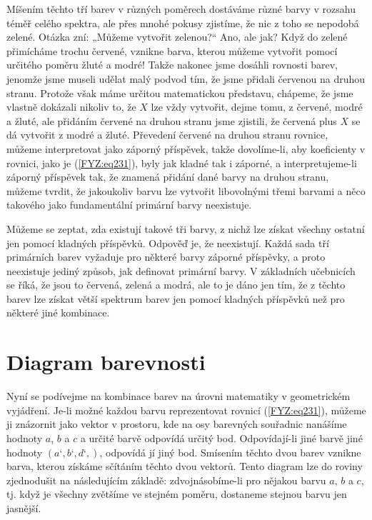 {    Míšením těchto tří barev v různých poměrech dostáváme různé barvy v rozsahu téměř celého 
    spektra, ale přes mnohé pokusy zjistíme, že nic z toho se nepodobá zelené. Otázka zní: „Můžeme 
    vytvořit zelenou?“ Ano, ale jak? Když do zelené přimícháme trochu červené, vznikne barva, 
    kterou můžeme vytvořit pomocí určitého poměru žluté a modré! Takže nakonec jsme dosáhli 
    rovnosti barev, jenomže jsme museli udělat malý podvod tím, že jsme přidali červenou na druhou 
    stranu. Protože však máme určitou matematickou představu, chápeme, že jsme vlastně dokázali 
    nikoliv to, že \(X\) lze vždy vytvořit, dejme tomu, z červené, modré a žluté, ale přidáním 
    červené na druhou stranu jsme zjistili, že červená plus \(X\) se dá vytvořit z modré a žluté. 
    Převedení červené na druhou stranu rovnice, můžeme interpretovat jako záporný příspěvek, takže 
    dovolíme-li, aby koeficienty v rovnici, jako je (\ref{FYZ:eq231}), byly jak kladné tak i 
    záporné, a interpretujeme-li záporný příspěvek tak, že znamená přidání dané barvy na druhou 
    stranu, můžeme tvrdit, že jakoukoliv barvu lze vytvořit libovolnými třemi barvami a něco 
    takového jako fundamentální primární barvy neexistuje.
    
    Můžeme se zeptat, zda existují takové tři barvy, z nichž lze získat všechny ostatní jen pomocí 
    kladných příspěvků. Odpověď je, že neexistují. Každá sada tří primárních barev vyžaduje pro 
    některé barvy záporné příspěvky, a proto neexistuje jediný způsob, jak definovat primární barvy.
    V základních učebnicích se říká, že jsou to červená, zelená a modrá, ale to je dáno jen tím, že 
    z těchto barev lze získat větší spektrum barev jen pomocí kladných příspěvků než pro některé 
    jiné kombinace.
    
  \section{Diagram barevnosti}\label{fyz:IchapXXXVsecIV}
    Nyní se podívejme na kombinace barev na úrovni matematiky v geometrickém vyjádření. Je-li možné 
    každou barvu reprezentovat rovnicí (\ref{FYZ:eq231}), můžeme ji znázornit jako vektor v 
    prostoru, kde na osy barevných souřadnic nanášíme hodnoty \(a\), \(b\) a \(c\) a určité barvě 
    odpovídá určitý bod. Odpovídají-li jiné barvě jiné hodnoty \((a‘, b‘, d‘,)\), odpovídá jí jiný 
    bod. Smísením těchto dvou barev vznikne barva, kterou získáme sčítáním těchto dvou vektorů. 
    Tento diagram lze do roviny zjednodušit na následujícím základě: zdvojnásobíme-li pro nějakou 
    barvu \(a\), \(b\) a \(c\), tj. když je všechny zvětšíme ve stejném poměru, dostaneme stejnou 
    barvu jen jasnější.
    
}
